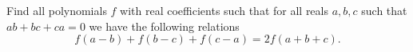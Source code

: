 Find all polynomials $f$ with real coefficients such that for all reals $a,b,c$ such that $ab+bc+ca = 0$ we have the following relations\[ f(a-b) + f(b-c) + f(c-a) = 2f(a+b+c). \]